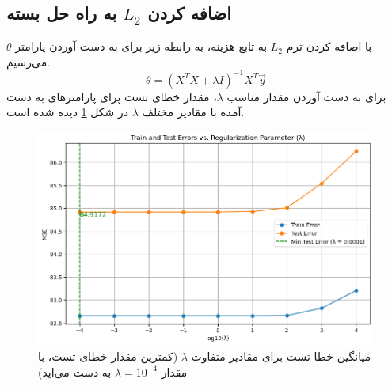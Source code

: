\documentclass{article}
\begin{document}
	\subsection{اضافه کردن $L_2$ به راه حل بسته}
	با اضافه کردن ترم $L_2$ به تابع هزینه، به رابطه زیر برای به دست آوردن پارامتر $\theta$ می‌رسیم.
	\[ \theta = (X^TX + \lambda I)^{-1}X^T\vec{y} \]
	برای به دست آوردن مقدار مناسب $\lambda$، مقدار خطای تست پرای پارامترهای به دست آمده با مقادیر مختلف $\lambda$ در شکل 
	\ref{fig: lambda_comparison}
	دیده شده است.
	\begin{figure}[H]
		\centering
		\includegraphics[scale=0.5]{figs/diff_lambda}
		\caption{میانگین خطا تست برای مقادیر متفاوت $\lambda$ (کمترین مقدار خطای تست، با مقدار $\lambda = 10^{-4}$ به دست می‌اید)}
		\label{fig: lambda_comparison}
	\end{figure}
	
	
	
	
	
\end{document}
